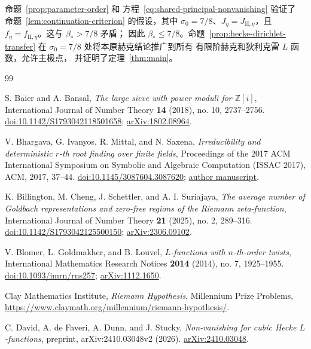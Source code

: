\documentclass[11pt,a4paper]{article}
\numberwithin{equation}{section}
\numberwithin{figure}{section}
\theoremstyle{definition}
\theoremstyle{remark}
\begin{document}
命题~\ref{prop:parameter-order} 和
方程~\eqref{eq:shared-principal-nonvanishing} 验证了
命题~\ref{lem:continuation-criterion} 的假设，其中
\(\sigma_0=7/8\)、\(J_\eta=J_{\mathrm{II},\eta}\)，且
\(f_\eta=f_{\mathrm{II},\eta}\)。这与 \(\beta_*>7/8\) 矛盾；
因此 \(\beta_*\le7/8\)。命题~\ref{prop:hecke-dirichlet-transfer}
在 \(\sigma_0=7/8\) 处将本原赫克结论推广到所有
有限阶赫克和狄利克雷 \(L\) 函数，允许主极点，
并证明了定理~\ref{thm:main}。\begin{thebibliography}{99}

S. Baier and A. Bansal,
\emph{The large sieve with power moduli for $\mathbb Z[i]$},
International Journal of Number Theory \textbf{14} (2018), no. 10,
2737--2756.
\href{https://doi.org/10.1142/S1793042118501658}{doi:10.1142/S1793042118501658};
\href{https://arxiv.org/abs/1802.08964}{arXiv:1802.08964}.

V. Bhargava, G. Ivanyos, R. Mittal, and N. Saxena,
\emph{Irreducibility and deterministic $r$-th root finding over finite fields},
Proceedings of the 2017 ACM International Symposium on Symbolic and
Algebraic Computation (ISSAC 2017), ACM, 2017, 37--44.
\href{https://doi.org/10.1145/3087604.3087620}{doi:10.1145/3087604.3087620};
\href{https://www.cse.iitk.ac.in/users/nitin/papers/irred-and-rth-root.pdf}{author manuscript}.

K. Billington, M. Cheng, J. Schettler, and A. I. Suriajaya,
\emph{The average number of Goldbach representations and zero-free regions
of the Riemann zeta-function},
International Journal of Number Theory \textbf{21} (2025), no. 2, 289--316.
\href{https://doi.org/10.1142/S1793042125500150}{doi:10.1142/S1793042125500150};
\href{https://arxiv.org/abs/2306.09102}{arXiv:2306.09102}.

V. Blomer, L. Goldmakher, and B. Louvel,
\emph{$L$-functions with $n$-th-order twists},
International Mathematics Research Notices \textbf{2014} (2014), no. 7,
1925--1955.
\href{https://doi.org/10.1093/imrn/rns257}{doi:10.1093/imrn/rns257};
\href{https://arxiv.org/abs/1112.1650}{arXiv:1112.1650}.

Clay Mathematics Institute,
\emph{Riemann Hypothesis}, Millennium Prize Problems,
\url{https://www.claymath.org/millennium/riemann-hypothesis/}.

C. David, A. de Faveri, A. Dunn, and J. Stucky,
\emph{Non-vanishing for cubic Hecke $L$-functions},
preprint, arXiv:2410.03048v2 (2026).
\href{https://arxiv.org/abs/2410.03048}{arXiv:2410.03048}.


\end{thebibliography}
\end{document}
